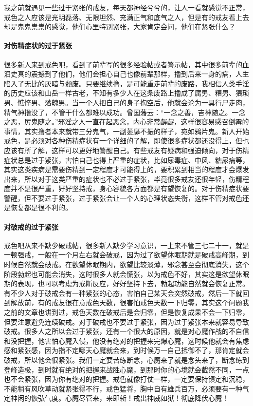 我之前就遇见一些过于紧张的戒友，每天都神经兮兮的，让人一看就感觉不正常，戒色之人应该是光明磊落、无限坦然、充满正气和底气之人，但是有的戒友看上去却是鬼鬼祟祟的感觉，他们心里特别紧张，大家肯定会问，他们在紧张什么？

\paragraph{对伤精症状的过于紧张}

很多新人来到戒色吧，看到了前辈写的很多经验帖或者警示帖，其中很多前辈的血泪史真的震撼到了他们，他们会担心自己也像前辈那样，撸到后来一身的病，人生陷入了无比的灰暗与颓废。只要继续撸，是可能重走前辈的废路，我相信人类手淫的历史应该和山岳一样古老，不知有多少人在这条废路上撸成了腐男、糟男、猥琐男、憔悴男、落魄男。当一个人把自己的身子掏空后，他就会沦为一具行尸走肉，精气神撸没了，不管干什么都难以成功。曾国藩云：“一念之善，吉神随之。一念之恶，厉鬼随之。”邪淫之人一直在起恶念，内心非常龌龊，这样很容易感召倒霉的事情，其实撸者本来就带三分鬼气，一副萎靡不振的样子，宛如鸦片鬼。新人开始戒色，是必须对各种伤精症状有一个详细的了解，即使很多症状都还没得上，但也应该有所了解，这样可以更好地警醒自己。有些戒友有疑病和强迫倾向，对于伤精症状总是过于紧张，害怕自己也得上严重的症状，比如尿毒症、中风、糖尿病等，其实这类疾病是需要伤精到一定程度才可能得上的，要积累到相当的程度才会爆发出来，所以对于这类严重的症状也不必过于紧张，毕竟很多戒友还很年轻，伤精程度并不是很严重，好好坚持戒，身心容貌各方面都是有望恢复的。对于伤精症状要警醒，但不要过于紧张，过于紧张会让一个人的心理状态失衡，这样不管对戒色还是恢复都是很不利的。

\paragraph{对破戒的过于紧张}

戒色吧从来不缺少破戒帖，很多新人缺少学习意识，一上来不管三七二十一，就是一顿强戒，一般在一个月左右就会破戒，因为过了欲望休眠期就是破戒高峰期，到时候自然就会破戒。在欲望休眠期内，欲望比较淡薄，邪念甚至会彻底消失，这个阶段勃起也可能会消失，这时很多人就会慌张，以为戒色不好，其实这是欲望休眠期的表现，也可以考虑为戒断反应，好好坚持下去，勃起功能自然就会恢复正常。有不少人对于破戒会有一种紧张的心态，害怕自己某天会突然破戒，然后一下就回到解放前，有的戒友很在意戒色天数，很害怕戒色天数一下归零，其实这个问题我之前的文章也讲到过，戒色天数在破戒后是会归零，但是恢复成果不会一下归零，但要注意避免连续破戒。对于破戒也不要过于紧张，因为过于紧张本来就容易导致破戒。很多人之所以会过于紧张，还有一个很大的原因，就是对心魔作战的不自信和没把握，他害怕心魔入侵，他没有绝对的把握来完爆心魔，这时候他就会有焦虑感和紧张感，因为指不定哪天心魔就会来，到时候万一自己抵御不了，那肯定就会破戒，所以他会很紧张。我们一定要苦练断念，心魔来了就是念头来了，断念练到登峰造极，到时就有绝对的把握来战胜心魔，到那时你的心境就会截然不同，一点也不会紧张，因为你有绝对的把握。戒色就像打仗一样，一定要保持镇定和沉稳，不能稍有风吹草动就紧张得不行，戒色猛将，胸中自有雄兵百万，必须要有一种气定神闲的恢弘气度。心魔尽管来，来即斩！戒出神威如狱！彻底降伏心魔！

